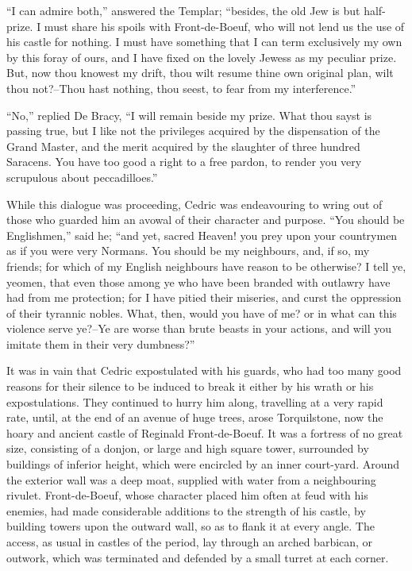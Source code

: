 ``I can admire both,'' answered the Templar; ``besides, the old Jew is
but half-prize. I must share his spoils with Front-de-Boeuf, who will
not lend us the use of his castle for nothing. I must have something
that I can term exclusively my own by this foray of ours, and I have
fixed on the lovely Jewess as my peculiar prize. But, now thou knowest
my drift, thou wilt resume thine own original plan, wilt thou not?--Thou
hast nothing, thou seest, to fear from my interference.''

``No,'' replied De Bracy, ``I will remain beside my prize. What thou
sayst is passing true, but I like not the privileges acquired by the
dispensation of the Grand Master, and the merit acquired by the
slaughter of three hundred Saracens. You have too good a right to a free
pardon, to render you very scrupulous about peccadilloes.''

While this dialogue was proceeding, Cedric was endeavouring to wring out
of those who guarded him an avowal of their character and purpose. ``You
should be Englishmen,'' said he; ``and yet, sacred Heaven! you prey upon
your countrymen as if you were very Normans. You should be my
neighbours, and, if so, my friends; for which of my English neighbours
have reason to be otherwise? I tell ye, yeomen, that even those among ye
who have been branded with outlawry have had from me protection; for I
have pitied their miseries, and curst the oppression of their tyrannic
nobles. What, then, would you have of me? or in what can this violence
serve ye?--Ye are worse than brute beasts in your actions, and will you
imitate them in their very dumbness?''

It was in vain that Cedric expostulated with his guards, who had too
many good reasons for their silence to be induced to break it either by
his wrath or his expostulations. They continued to hurry him along,
travelling at a very rapid rate, until, at the end of an avenue of huge
trees, arose Torquilstone, now the hoary and ancient castle of Reginald
Front-de-Boeuf. It was a fortress of no great size, consisting of a
donjon, or large and high square tower, surrounded by buildings of
inferior height, which were encircled by an inner court-yard. Around the
exterior wall was a deep moat, supplied with water from a neighbouring
rivulet. Front-de-Boeuf, whose character placed him often at feud with
his enemies, had made considerable additions to the strength of his
castle, by building towers upon the outward wall, so as to flank it at
every angle. The access, as usual in castles of the period, lay through
an arched barbican, or outwork, which was terminated and defended by a
small turret at each corner.

